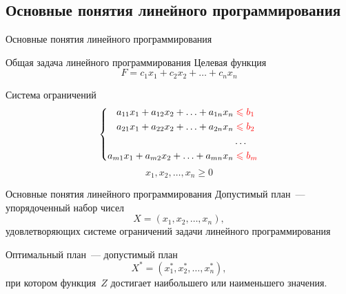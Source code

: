 \documentclass[unicode,11pt,notheorems]{beamer}
\begin{document}
%		
%		
%		
%			
	
	
	\subsection{Основные понятия линейного программирования}
	
	\begin{frame}[t]{}{}
		\vspace{2cm}
		{\LARGE Основные понятия линейного программирования\par}
		\vspace{\fill}
		
	\end{frame}   
	\begin{frame}{Общая задача линейного программирования}{}
		\alert{Целевая функция}
		$$
		F=c_1x_1+c_2x_2+\ldots+c_n x_n
		$$
		
		\alert{Система ограничений}
		$$
		\left\lbrace
		\begin{aligned}
		a_{11} x_1 + a_{12} x_2 + \ldots + a_{1n} x_n & \color{red} \leqslant b_1\\
		a_{21} x_1 + a_{22} x_2 + \ldots + a_{2n} x_n &\color{red} \leqslant b_2\\
		&\ldots\\
		a_{m1} x_1 + a_{m2} x_2 + \ldots + a_{mn} x_n &\color{red} \leqslant b_m
		\end{aligned}
		\right.
		$$
		$$x_1, x_2, \ldots, x_n \geqslant 0$$
		
	\end{frame}   
	
	
	
	
	\begin{frame}{Основные понятия линейного программирования}{}
		\alert{Допустимый план}~--- упорядоченный набор чисел
		$$
		X=(x_1,x_2,\ldots,x_n),
		$$    
		удовлетворяющих системе ограничений задачи линейного программирования
		
		\vspace{4em}
		
		\alert{Оптимальный план}~--- допустимый	план
		$$
		X^*=(x_1^*,x_2^*,\ldots,x_n^*),
		$$    
		при котором функция~$Z$ достигает наибольшего или наименьшего значения.
		
	\end{frame} 
	
\end{document}
